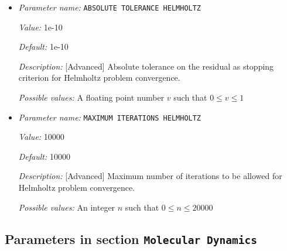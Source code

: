 \begin{itemize}
\item {\it Parameter name:} {\tt ABSOLUTE TOLERANCE HELMHOLTZ}
\label{parameters:Helmholtz problem parameters/ABSOLUTE TOLERANCE HELMHOLTZ}
\label{parameters:Helmholtz_20problem_20parameters/ABSOLUTE_20TOLERANCE_20HELMHOLTZ}


{\it Value:} 1e-10


{\it Default:} 1e-10


{\it Description:} [Advanced] Absolute tolerance on the residual as stopping criterion for Helmholtz problem convergence.


{\it Possible values:} A floating point number $v$ such that $0 \leq v \leq 1$
\item {\it Parameter name:} {\tt MAXIMUM ITERATIONS HELMHOLTZ}
\label{parameters:Helmholtz problem parameters/MAXIMUM ITERATIONS HELMHOLTZ}
\label{parameters:Helmholtz_20problem_20parameters/MAXIMUM_20ITERATIONS_20HELMHOLTZ}


{\it Value:} 10000


{\it Default:} 10000


{\it Description:} [Advanced] Maximum number of iterations to be allowed for Helmholtz problem convergence.


{\it Possible values:} An integer $n$ such that $0\leq n \leq 20000$
\end{itemize}

\subsection{Parameters in section \tt Molecular Dynamics}
\label{parameters:Molecular_20Dynamics}


